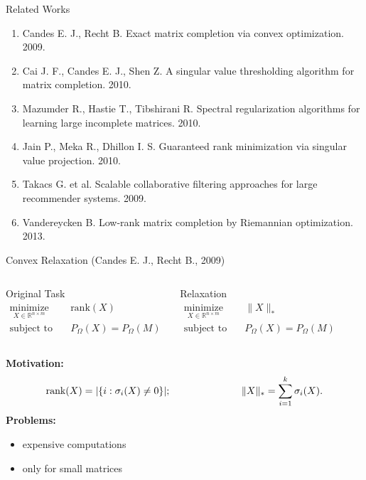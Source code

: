 \documentclass{beamer}
\begin{document}
\begin{frame}{Related Works}
\begin{enumerate}
	\item Candes E. J., Recht B. Exact matrix completion via convex optimization. 2009.
	\item Cai J. F., Candes E. J., Shen Z. A singular value thresholding algorithm for matrix completion. 2010.
	\item Mazumder R., Hastie T., Tibshirani R. Spectral regularization algorithms for learning large incomplete matrices. 2010.
	\item Jain P., Meka R., Dhillon I. S. Guaranteed rank minimization via singular value projection. 2010.
	\item Takacs G. et al. Scalable collaborative filtering approaches for large recommender systems. 2009.
	\item Vandereycken B. Low-rank matrix completion by Riemannian optimization. 2013.
\end{enumerate}
\end{frame}
\begin{frame}{Convex Relaxation (Candes E. J., Recht B., 2009)}  \begin{columns}[c]
	\begin{block}{Original Task}
		\vspace{-0.5cm}
		\begin{align*}
		\mathop{\text{minimize}}\limits_{X \in \mathbb{R}^{n \times m}} \quad & 
		\text{rank} (X) \\
		\text{subject to} \quad & P_{\Omega} (X) = P_{\Omega} (M)
		\end{align*}
	\end{block}
	
	\begin{block}{Relaxation}
		\vspace{-0.5cm}
		\begin{align*}
		\mathop{\text{minimize}}\limits_{X \in \mathbb{R}^{n \times m}} \quad & 
		\| X \|_* \\
		\text{subject to} \quad & P_{\Omega} (X) = P_{\Omega} (M)
		\end{align*}
	\end{block}
\end{columns}
\vspace{0.3cm}
\textbf{Motivation:}
$$
	\text{rank} (X) = |\{ i: \sigma_i(X) \neq 0\}|;  \hspace{2.5cm} 
	\| X \|_* = \sum_{i=1}^{k} \sigma_i(X).
$$
\textbf{Problems:}
\begin{itemize}
	\item expensive computations
	\item only for small matrices
\end{itemize}
\end{frame}
\end{document}

